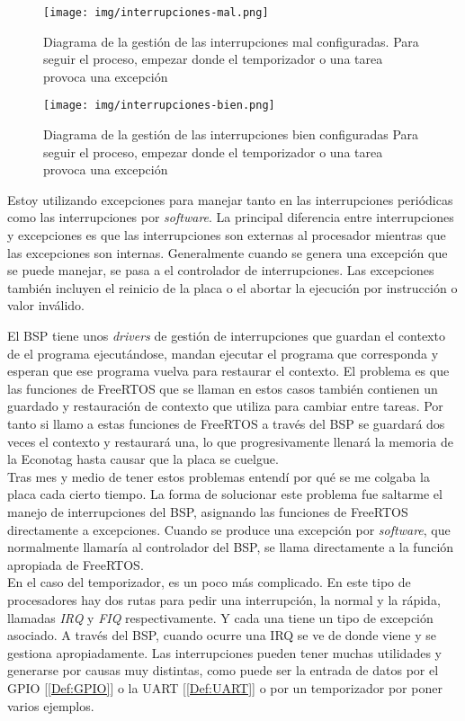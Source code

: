 \begin{figure}[!ht]
\centering
\texttt{[image: img/interrupciones-mal.png]}
\caption{Diagrama de la gestión de las interrupciones mal configuradas. Para seguir el proceso, empezar donde el temporizador o una tarea provoca una excepción}
\label{fig:interrupciones-mal}
\end{figure}

\begin{figure}[!ht]
\centering
\texttt{[image: img/interrupciones-bien.png]}
\caption{Diagrama de la gestión de las interrupciones bien configuradas Para seguir el proceso, empezar donde el temporizador o una tarea provoca una excepción}
\label{fig:interrupciones-bien}
\end{figure}

Estoy utilizando excepciones para manejar tanto en las interrupciones periódicas como las interrupciones por \emph{software}. La principal diferencia entre interrupciones y excepciones es que las interrupciones son externas al procesador mientras que las excepciones son internas. Generalmente cuando se genera una excepción que se puede manejar, se pasa a el controlador de interrupciones. Las excepciones también incluyen el reinicio de la placa o el abortar la ejecución por instrucción o valor inválido.

El BSP tiene unos \emph{drivers} de gestión de interrupciones que guardan el contexto de el programa ejecutándose, mandan ejecutar el programa que corresponda y esperan que ese programa vuelva para restaurar el contexto. El problema es que las funciones de FreeRTOS que se llaman en estos casos también contienen un guardado y restauración de contexto que utiliza para cambiar entre tareas. Por tanto si llamo a estas funciones de FreeRTOS a través del BSP se guardará dos veces el contexto y restaurará una, lo que progresivamente llenará la memoria de la Econotag hasta causar que la placa se cuelgue.\\

Tras mes y medio de tener estos problemas entendí por qué se me colgaba la placa cada cierto tiempo. La forma de solucionar este problema fue saltarme el manejo de interrupciones del BSP, asignando las funciones de FreeRTOS directamente a excepciones. Cuando se produce una excepción por \emph{software}, que normalmente llamaría al controlador del BSP, se llama directamente a la función apropiada de FreeRTOS.\\

En el caso del temporizador, es un poco más complicado. En este tipo de procesadores hay dos rutas para pedir una interrupción, la normal y la rápida, llamadas \emph{IRQ} y \emph{FIQ} respectivamente. Y cada una tiene un tipo de excepción asociado. A través del BSP, cuando ocurre una IRQ se ve de donde viene y se gestiona apropiadamente. Las interrupciones pueden tener muchas utilidades y generarse por causas muy distintas, como puede ser la entrada de datos por el GPIO [\ref{Def:GPIO}] o la UART [\ref{Def:UART}] o por un temporizador por poner varios ejemplos.

